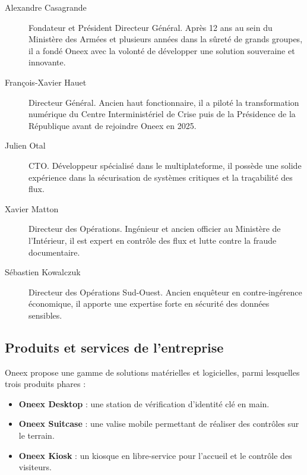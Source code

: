 \begin{description}
  \item[Alexandre Casagrande] Fondateur et Président Directeur Général. Après 12 ans au sein du Ministère des Armées et plusieurs années dans la sûreté de grands groupes, il a fondé Oneex avec la volonté de développer une solution souveraine et innovante.
  
  \item[François-Xavier Hauet] Directeur Général. Ancien haut fonctionnaire, il a piloté la transformation numérique du Centre Interministériel de Crise puis de la Présidence de la République avant de rejoindre Oneex en 2025.
  
  \item[Julien Otal] CTO. Développeur spécialisé dans le multiplateforme, il possède une solide expérience dans la sécurisation de systèmes critiques et la traçabilité des flux.
  
  \item[Xavier Matton] Directeur des Opérations. Ingénieur et ancien officier au Ministère de l’Intérieur, il est expert en contrôle des flux et lutte contre la fraude documentaire.
  
  
  \item[Sébastien Kowalczuk] Directeur des Opérations Sud-Ouest. Ancien enquêteur en contre-ingérence économique, il apporte une expertise forte en sécurité des données sensibles.
\end{description}


\subsection{Produits et services de l'entreprise}

Oneex propose une gamme de solutions matérielles et logicielles, parmi lesquelles trois produits phares :

\begin{itemize}
  \item \textbf{Oneex Desktop} : une station de vérification d’identité clé en main.
  \item \textbf{Oneex Suitcase} : une valise mobile permettant de réaliser des contrôles sur le terrain.
  \item \textbf{Oneex Kiosk} : un kiosque en libre-service pour l’accueil et le contrôle des visiteurs.
\end{itemize}

